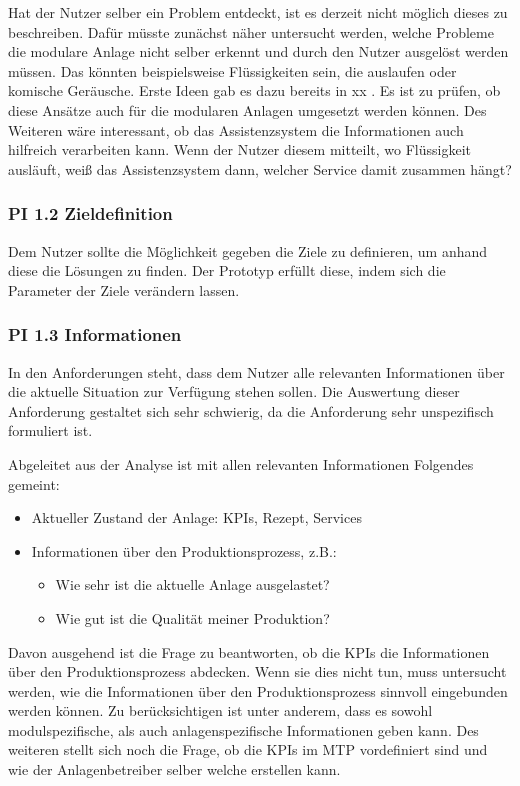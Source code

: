 Hat der Nutzer selber ein Problem entdeckt, ist es derzeit nicht möglich dieses zu beschreiben. Dafür müsste zunächst näher untersucht werden, welche Probleme die modulare Anlage nicht selber erkennt und durch den Nutzer ausgelöst werden müssen. Das könnten beispielsweise Flüssigkeiten sein, die auslaufen oder komische Geräusche. Erste Ideen gab es dazu bereits in xx . Es ist zu prüfen, ob diese Ansätze auch für die modularen Anlagen umgesetzt werden können. Des Weiteren wäre interessant, ob das Assistenzsystem die Informationen auch hilfreich verarbeiten kann. Wenn der Nutzer diesem mitteilt, wo Flüssigkeit ausläuft, weiß das Assistenzsystem dann, welcher Service damit zusammen hängt?

\subsubsection*{PI 1.2 Zieldefinition}
Dem Nutzer sollte die Möglichkeit gegeben die Ziele zu definieren, um anhand diese die Lösungen zu finden. Der Prototyp erfüllt diese, indem sich die Parameter der Ziele verändern lassen.

\subsubsection*{PI 1.3 Informationen}
In den Anforderungen steht, dass dem Nutzer alle relevanten Informationen über die aktuelle Situation zur Verfügung stehen sollen. Die Auswertung dieser Anforderung gestaltet sich sehr schwierig, da die Anforderung sehr unspezifisch formuliert ist.

Abgeleitet aus der Analyse ist mit allen relevanten Informationen Folgendes gemeint:
\begin{itemize}
\item Aktueller Zustand der Anlage: KPIs, Rezept, Services
\item Informationen über den Produktionsprozess, z.B.:
	\begin{itemize}
	\item Wie sehr ist die aktuelle Anlage ausgelastet?
	\item Wie gut ist die Qualität meiner Produktion?
\end{itemize}
\end{itemize}
Davon ausgehend ist die Frage zu beantworten, ob die KPIs die Informationen über den Produktionsprozess abdecken. Wenn sie dies nicht tun, muss untersucht werden, wie die Informationen über den Produktionsprozess sinnvoll eingebunden werden können. Zu berücksichtigen ist unter anderem, dass es sowohl modulspezifische, als auch anlagenspezifische Informationen geben kann. Des weiteren stellt sich noch die Frage, ob die KPIs im MTP vordefiniert sind und wie der Anlagenbetreiber selber welche erstellen kann.

